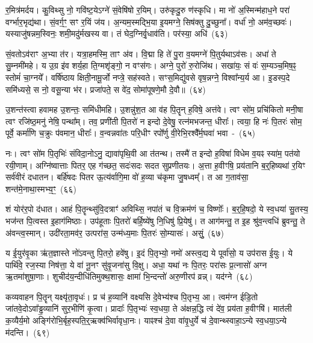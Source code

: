 र॒मित्र॑मर्दय। कु॒विथ्सु नो॒ गवि॑ष्ट॒ये\-ऽग्ने॑ सं॒वेषि॑षो र॒यिम्। उरु॑कृदु॒रु ण॑स्कृधि। मा नो॑ अ॒स्मिन्म॑हाध॒ने परा॑ वर्ग्भार॒भृद्य॑था। सं॒वर्ग॒ꣳ॒ सꣳ र॒यिं ज॑य। अ॒न्यम॒स्मद्भि॒या इ॒यमग्ने॒ सिष॑क्तु दु॒च्छुना᳚। वर्धा॑ नो॒ अम॑व॒च्छवः॑। यस्याजु॑षन्नम॒स्विनः॒ शमी॒मदु॑र्मखस्य वा। तं घेद॒ग्निर्वृ॒धाव॑ति। पर॑स्या॒ अधि॑~(६३)\ip

सं॒वतो\-ऽव॑राꣳ अ॒भ्या त॑र। यत्रा॒हमस्मि॒ ताꣳ अ॑व। वि॒द्मा हि ते॑ पु॒रा व॒यमग्ने॑ पि॒तुर्यथाऽव॑सः। अधा॑ ते सु॒म्नमी॑महे। य उ॒ग्र इ॑व शर्य॒हा ति॒ग्मशृ॑ङ्गो॒ न वꣳस॑गः। अग्ने॒ पुरो॑ रु॒रोजि॑थ। सखा॑यः॒ सं वः॑ स॒म्यञ्च॒मिष॒ꣴ॒ स्तोमं॑ चा॒ग्नये᳚। वर्\mbox{}षि॑ष्ठाय क्षिती॒नामू॒र्जो नप्त्रे॒ सह॑\-स्वते। सꣳस॒मिद्यु॑वसे वृष॒न्नग्ने॒ विश्वा᳚न्य॒र्य आ। इ॒डस्प॒दे समि॑ध्यसे॒ स नो॒ वसू॒न्या भ॑र। प्रजा॑पते॒ स वे॑द॒ सोमा॑पूषणे॒मौ दे॒वौ॥~(६४)\ip

{\anuvakamend[{य॒ज्ञममै॒रधि॑ वृष॒न्नेका॒न्नविꣳ॑श॒तिश्च॑}]}%

उ॒शन्त॑स्त्वा हवामह उ॒शन्तः॒ समि॑धीमहि। उ॒शन्नु॑श॒त आ व॑ह पि॒तॄन् ह॒विषे॒ अत्त॑वे। त्वꣳ सो॑म॒ प्रचि॑कितो मनी॒षा त्वꣳ रजि॑ष्ठ॒मनु॑ नेषि॒ पन्था᳚म्। तव॒ प्रणी॑ती पि॒तरो॑ न इन्दो दे॒वेषु॒ रत्न॑मभजन्त॒ धीराः᳚। त्वया॒ हि नः॑ पि॒तरः॑ सोम॒ पूर्वे॒ कर्मा॑णि च॒क्रुः प॑वमान॒ धीराः᳚। व॒न्वन्नवा॑तः परि॒धीꣳ रपो᳚र्णु वी॒रेभि॒रश्वै᳚र्म॒घवा॑ भवा~-~(६५)\ip

नः। त्वꣳ सो॑म पि॒तृभिः॑ संविदा॒नो\-ऽनु॒ द्यावा॑\-पृथि॒वी आ त॑तन्थ। तस्मै॑ त इन्दो ह॒विषा॑ विधेम व॒यꣴ स्या॑म॒ पत॑यो रयी॒णाम्। अग्नि॑ष्वात्ताः पितर॒ एह ग॑च्छत॒ सदः॑सदः सदत सुप्रणीतयः। अ॒त्ता ह॒वीꣳषि॒ प्रय॑तानि ब॒र्॒\mbox{}हिष्यथा॑ र॒यिꣳ सर्व॑वीरं दधातन। बर्\mbox{}हि॑षदः पितर ऊ॒त्य॑र्वागि॒मा वो॑ ह॒व्या च॑कृमा जु॒षध्वम्᳚। त आ ग॒ताव॑सा॒ शन्त॑मे॒नाथा॒स्मभ्य॒ꣳ॒~(६६)\ip

शं योर॑र॒पो द॑धात। आहं पि॒तॄन्थ्सु॑वि॒दत्राꣳ॑ अविथ्सि॒ नपा॑तं च वि॒क्रम॑णं च॒ विष्णोः᳚। ब॒र्॒\mbox{}हि॒षदो॒ ये स्व॒धया॑ सु॒तस्य॒ भज॑न्त पि॒त्वस्त इ॒हाग॑मिष्ठाः। उप॑हूताः पि॒तरो॑ बर्\mbox{}हि॒ष्ये॑षु नि॒धिषु॑ प्रि॒येषु॑। त आग॑मन्तु॒ त इ॒ह श्रु॑व॒न्त्वधि॑ ब्रुवन्तु॒ ते अ॑वन्त्व॒स्मान्। उदी॑रता॒मव॑र॒ उत्परा॑स॒ उन्म॑ध्य॒माः पि॒तरः॑ सो॒म्यासः॑। असुं॒~(६७)\ip

य ई॒युर॑वृ॒का ऋ॑त॒ज्ञास्ते नो॑\-ऽवन्तु पि॒तरो॒ हवे॑षु। इ॒दं पि॒तृभ्यो॒ नमो॑ अस्त्व॒द्य ये पूर्वा॑सो॒ य उप॑रास ई॒युः। ये पार्थि॑वे॒ रज॒स्या निष॑त्ता॒ ये वा॑ नू॒नꣳ सु॑वृ॒जना॑सु वि॒क्षु। अधा॒ यथा॑ नः पि॒तरः॒ परा॑सः प्र॒त्नासो॑ अग्न ऋ॒तमा॑शुषा॒णाः। शुचीद॑य॒न्दीधि॑तिमुक्थ॒शासः॒ क्षामा॑ भि॒न्दन्तो॑ अरु॒णीरप॑ व्रन्न्। यद॑ग्ने~(६८)\ip

कव्यवाहन पि॒तॄन् यक्ष्यृ॑ता॒वृधः॑। प्र च॑ ह॒व्यानि॑ वक्ष्यसि दे॒वेभ्य॑श्च पि॒तृभ्य॒ आ। त्वम॑ग्न ईडि॒तो जा॑तवे॒दो\-ऽवा᳚ड्ढ॒व्यानि॑ सुर॒भीणि॑ कृ॒त्वा। प्रादाः᳚ पि॒तृभ्यः॑ स्व॒धया॒ ते अ॑क्षन्न॒द्धि त्वं दे॑व॒ प्रय॑ता ह॒वीꣳषि॑। मात॑ली क॒व्यैर्य॒मो अङ्गि॑रोभि॒र्बृह॒स्पति॒र्॒\mbox{}ऋक्व॑भिर्वावृधा॒नः। याꣴश्च॑ दे॒वा वा॑वृ॒धुर्ये च॑ दे॒वान्थ्\-स्वाहा॒\-ऽन्ये स्व॒धया॒\-ऽन्ये म॑दन्ति।~(६९)\ip

